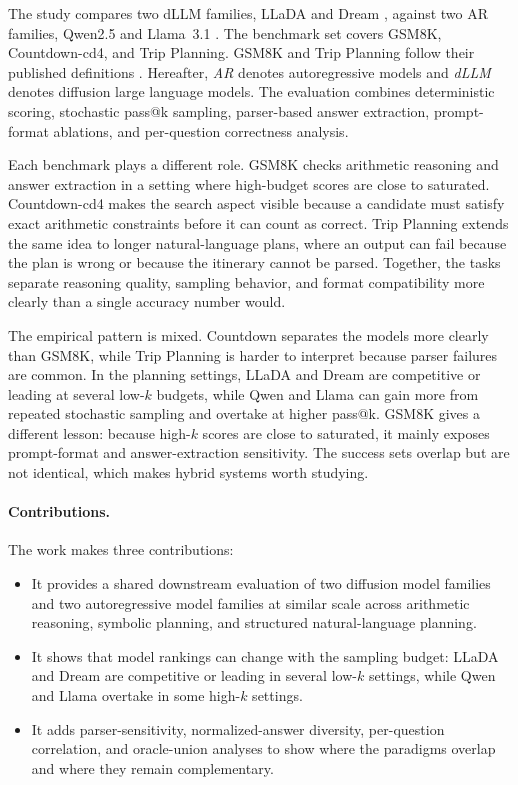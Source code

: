 The study compares two dLLM families, LLaDA and Dream
\cite{nie2025llada,ye2025dream}, against two AR families, Qwen2.5 and
Llama~3.1 \cite{qwen2024qwen25,grattafiori2024llama}. The benchmark set covers
GSM8K, Countdown-cd4, and Trip Planning. GSM8K and Trip Planning follow their
published definitions \cite{cobbe2021gsm8k,xie2024travelplanner}. Hereafter,
\emph{AR} denotes autoregressive models and \emph{dLLM} denotes diffusion large
language models. The evaluation combines deterministic scoring, stochastic
pass@k sampling, parser-based answer extraction, prompt-format ablations, and
per-question correctness analysis.

Each benchmark plays a different role. GSM8K checks arithmetic reasoning and
answer extraction in a setting where high-budget scores are close to saturated.
Countdown-cd4 makes the search aspect visible because a candidate must satisfy
exact arithmetic constraints before it can count as correct. Trip Planning
extends the same idea to longer natural-language plans, where an output can
fail because the plan is wrong or because the itinerary cannot be parsed.
Together, the tasks separate reasoning quality, sampling behavior, and format
compatibility more clearly than a single accuracy number would.

The empirical pattern is mixed. Countdown separates the models more clearly
than GSM8K, while Trip Planning is harder to interpret because parser failures
are common. In the planning settings, LLaDA and Dream are competitive or
leading at several low-$k$ budgets, while Qwen and Llama can gain more from
repeated stochastic sampling and overtake at higher pass@k. GSM8K gives a
different lesson: because high-$k$ scores are close to saturated, it mainly
exposes prompt-format and answer-extraction sensitivity. The success sets
overlap but are not identical, which makes hybrid systems worth studying.

\paragraph{Contributions.}
The work makes three contributions:
\begin{itemize}
    \item It provides a shared downstream evaluation of two diffusion model
    families and two autoregressive model families at similar scale across
    arithmetic reasoning, symbolic planning, and structured natural-language
    planning.
    \item It shows that model rankings can change with the sampling budget:
    LLaDA and Dream are competitive or leading in several low-$k$ settings,
    while Qwen and Llama overtake in some high-$k$ settings.
    \item It adds parser-sensitivity, normalized-answer diversity,
    per-question correlation, and oracle-union analyses to show where the
    paradigms overlap and where they remain complementary.
\end{itemize}

